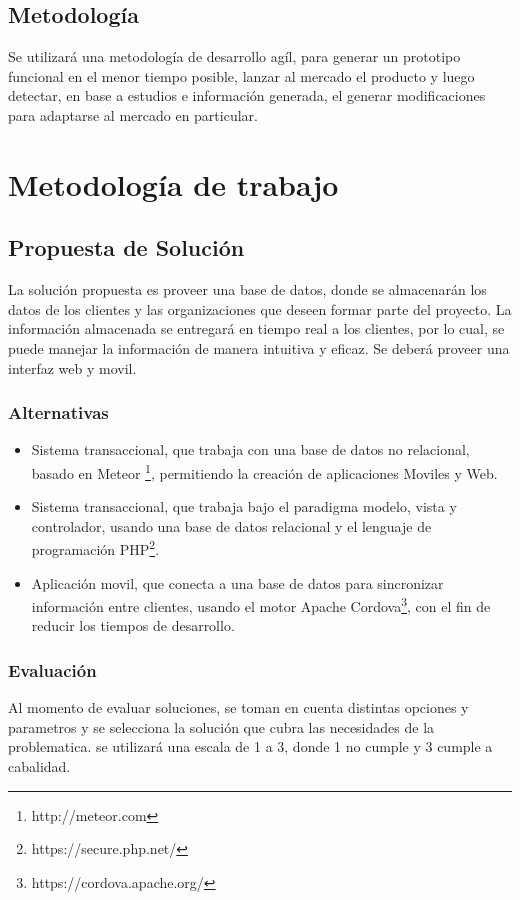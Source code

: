 \documentclass[letterpaper,openright,10pt,twoside]{report}
\begin{document}
		\section{Metodología}
			Se utilizará una metodología de desarrollo agíl, para generar un prototipo funcional en el menor tiempo posible, lanzar al mercado el producto y luego detectar, en base a estudios e información generada, el generar modificaciones para adaptarse al mercado en particular.
	\chapter{Metodología de trabajo}
		\section{Propuesta de Solución}
			La solución propuesta es proveer una base de datos, donde se almacenarán los datos de los clientes y las organizaciones que deseen formar parte del proyecto. La información almacenada se entregará en tiempo real a los clientes, por lo cual, se puede manejar la información de manera intuitiva y eficaz. Se deberá proveer una interfaz web y movil.
			\subsection{Alternativas}
				\begin{itemize}
					\item Sistema transaccional, que trabaja con una base de datos no relacional, basado en Meteor \footnote{http://meteor.com}, permitiendo la creación de aplicaciones Moviles y Web.
					\item Sistema transaccional, que trabaja bajo el paradigma modelo, vista y controlador, usando una base de datos relacional y el lenguaje de programación PHP\footnote{https://secure.php.net/}.
					\item Aplicación movil, que conecta a una base de datos para sincronizar información entre clientes, usando el motor Apache Cordova\footnote{https://cordova.apache.org/}, con el fin de reducir los tiempos de desarrollo.
				\end{itemize}
			\subsection{Evaluación}
				Al momento de evaluar soluciones, se toman en cuenta distintas opciones y parametros y se selecciona la solución que cubra las necesidades de la problematica. se utilizará una escala de 1 a 3, donde 1 no cumple y 3 cumple a cabalidad.
\end{document}
